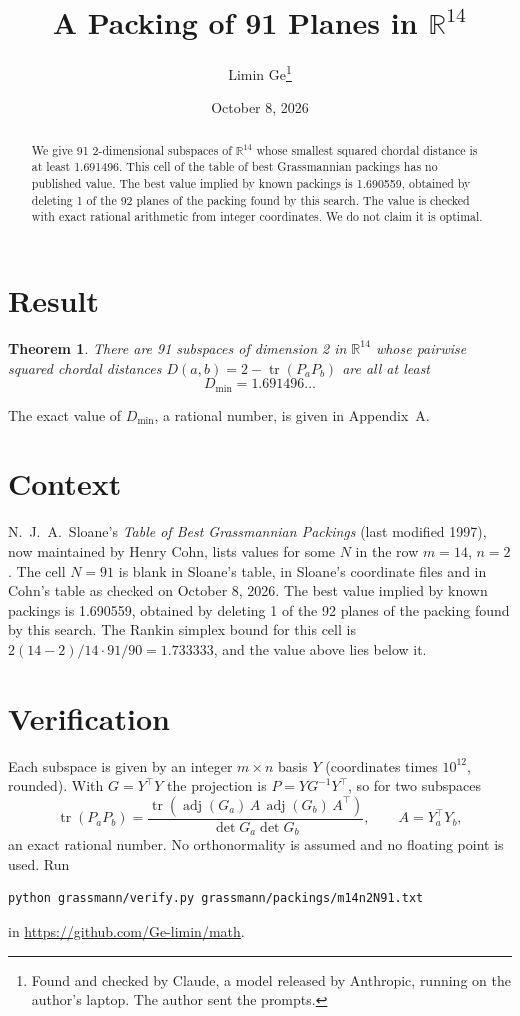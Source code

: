 \documentclass[11pt,a4paper]{article}
\title{A Packing of 91 Planes in $\mathbb{R}^{14}$}
\author{Limin Ge\thanks{Found and checked by Claude, a model released by Anthropic, running on the author's laptop. The author sent the prompts.}}
\date{October 8, 2026}
\newtheorem*{theorem}{Theorem}
\begin{document}
\maketitle
\begin{abstract}
We give 91 2-dimensional subspaces of $\mathbb{R}^{14}$ whose smallest squared chordal distance is at least 1.691496. This cell of the table of best Grassmannian packings has no published value. The best value implied by known packings is 1.690559, obtained by deleting 1 of the 92 planes of the packing found by this search. The value is checked with exact rational arithmetic from integer coordinates. We do not claim it is optimal.
\end{abstract}

\section{Result}
\begin{theorem}
There are 91 subspaces of dimension 2 in $\mathbb{R}^{14}$ whose pairwise squared chordal distances $D(a,b) = 2 - \operatorname{tr}(P_aP_b)$ are all at least
\[ D_{\min} = 1.691496\ldots \]
\end{theorem}
The exact value of $D_{\min}$, a rational number, is given in Appendix~A.


\section{Context}
N.~J.~A.~Sloane's \emph{Table of Best Grassmannian Packings} (last modified 1997), now maintained by Henry Cohn, lists values for some $N$ in the row $m=14$, $n=2$. The cell $N=91$ is blank in Sloane's table, in Sloane's coordinate files and in Cohn's table as checked on October 8, 2026. The best value implied by known packings is 1.690559, obtained by deleting 1 of the 92 planes of the packing found by this search. The Rankin simplex bound for this cell is $2(14-2)/14\cdot 91/90 = 1.733333$, and the value above lies below it.


\section{Verification}
Each subspace is given by an integer $m\times n$ basis $Y$ (coordinates times $10^{12}$, rounded). With $G=Y^\top Y$ the projection is $P=YG^{-1}Y^\top$, so for two subspaces
\[ \operatorname{tr}(P_aP_b)=\frac{\operatorname{tr}(\operatorname{adj}(G_a)\,A\,\operatorname{adj}(G_b)\,A^\top)}{\det G_a\det G_b},\qquad A=Y_a^\top Y_b, \]
an exact rational number. No orthonormality is assumed and no floating point is used. Run
\begin{verbatim}
python grassmann/verify.py grassmann/packings/m14n2N91.txt
\end{verbatim}
in \url{https://github.com/Ge-limin/math}.
\end{document}
